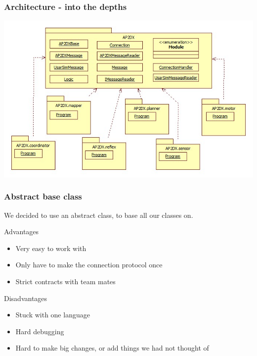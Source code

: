 \documentclass{beamer}
\begin{document}
\begin{frame}
\frametitle{Architecture - into the depths}
\includegraphics[width=.8\paperwidth]{AP2DX}
\end{frame}

\begin{frame}
\frametitle{Abstract base class}
We decided to use an abstract class, to base all our classes on.
\begin{block}{Advantages}
\begin{itemize}
\item Very easy to work with
\item Only have to make the connection protocol once
\item Strict contracts with team mates
\end{itemize}
\end{block}
\begin{block}{Disadvantages}
\begin{itemize}
\item Stuck with one language
\item Hard debugging
\item Hard to make big changes, or add things we had not thought of
\end{itemize}
\end{block}
\end{frame}
\end{document}
